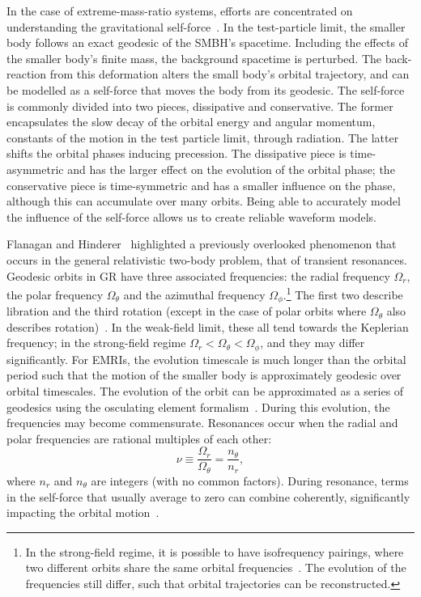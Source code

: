 \documentclass[aps,prd,amsfonts,amssymb,amsmath,nofootinbib,showpacs,superscriptaddress,twocolumn,floatfix]{revtex4-1}
\begin{document}
In the case of extreme-mass-ratio systems, efforts are concentrated on understanding the gravitational self-force~\cite{Barack2009,Poisson2004}. In the test-particle limit, the smaller body follows an exact geodesic of the SMBH's spacetime. Including the effects of the smaller body's finite mass, the background spacetime is perturbed. The back-reaction from this deformation alters the small body's orbital trajectory, and can be modelled as a self-force that moves the body from its geodesic. The self-force is commonly divided into two pieces, dissipative and conservative. The former encapsulates the slow decay of the orbital energy and angular momentum, constants of the motion in the test particle limit, through radiation. The latter shifts the orbital phases inducing precession. The dissipative piece is time-asymmetric and has the larger effect on the evolution of the orbital phase; the conservative piece is time-symmetric and has a smaller influence on the phase, although this can accumulate over many orbits. Being able to accurately model the influence of the self-force allows us to create reliable waveform models.

Flanagan and Hinderer~\cite{Flanagan2012} highlighted a previously overlooked phenomenon that occurs in the general relativistic two-body problem, that of transient resonances. Geodesic orbits in GR have three associated frequencies: the radial frequency $\Omega_r$, the polar frequency $\Omega_\theta$ and the azimuthal frequency $\Omega_\phi$.\footnote{In the strong-field regime, it is possible to have isofrequency pairings, where two different orbits share the same orbital frequencies~\cite{Warburton2013}. The evolution of the frequencies still differ, such that orbital trajectories can be reconstructed.} The first two describe libration and the third rotation (except in the case of polar orbits where $\Omega_\theta$ also describes rotation)~\cite{Goldstein2002}. %
In the weak-field limit, these all tend towards the Keplerian frequency; in the strong-field regime $\Omega_r < \Omega_\theta < \Omega_\phi$, and they may differ significantly. For EMRIs, the evolution timescale is much longer than the orbital period such that the motion of the smaller body is approximately geodesic over orbital timescales. The evolution of the orbit can be approximated as a series of geodesics using the osculating element formalism~\cite{Pound2008,Gair2011a}. During this evolution, the frequencies may become commensurate. Resonances occur when the radial and polar frequencies are rational multiples of each other:
\begin{equation}
\nu \equiv \frac{\Omega_r}{\Omega_\theta} = \frac{n_\theta}{n_r},
\end{equation}
where $n_r$ and $n_\theta$ are integers (with no common factors). During resonance, terms in the self-force that usually average to zero can combine coherently, significantly impacting the orbital motion~\cite{Flanagan2012a}.
\end{document}
